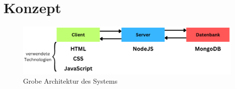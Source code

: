 \chapter{Konzept}

\begin{figure}
	\includegraphics[width=\textwidth]{images/Architektur.png}
	\caption{Grobe Architektur des Systems}
\end{figure}
